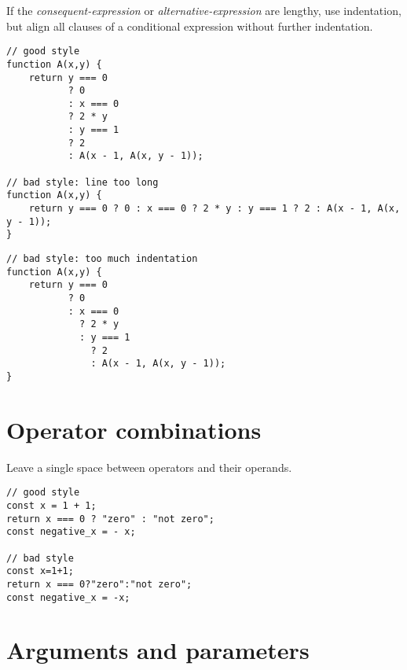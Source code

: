 If the \textit{consequent-expression} or \textit{alternative-expression} are lengthy, use
indentation, but align all clauses of a conditional expression without further indentation.
%
\begin{lstlisting}
// good style
function A(x,y) {
    return y === 0
           ? 0
           : x === 0
           ? 2 * y
           : y === 1
           ? 2
           : A(x - 1, A(x, y - 1));

// bad style: line too long
function A(x,y) {
    return y === 0 ? 0 : x === 0 ? 2 * y : y === 1 ? 2 : A(x - 1, A(x, y - 1));
}
\end{lstlisting}
\newpage
\begin{lstlisting}
// bad style: too much indentation
function A(x,y) {
    return y === 0
           ? 0
           : x === 0
             ? 2 * y
             : y === 1
               ? 2
               : A(x - 1, A(x, y - 1));
}
\end{lstlisting}

\vspace{-4mm}

\section*{Operator combinations}

Leave a single space between operators and their operands.
	
\begin{lstlisting}
// good style
const x = 1 + 1;
return x === 0 ? "zero" : "not zero";
const negative_x = - x;

// bad style
const x=1+1;
return x === 0?"zero":"not zero";
const negative_x = -x;
\end{lstlisting}

\vspace{-4mm}

\section*{Arguments and parameters}

